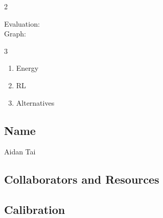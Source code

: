 \documentclass[submit]{harvardml}
\begin{document}
\newpage
\begin{sol}{}{2}
  \begin{center}
    Evaluation:\\
    Graph:
  \end{center}
\end{sol}


\newpage
\begin{sol}{}{3}
  \begin{center}
    \begin{enumerate}
        \item Energy
        \item RL
        \item Alternatives
    \end{enumerate}
  \end{center}
\end{sol}

\newpage
\subsection*{Name}
Aidan Tai
\subsection*{Collaborators and Resources}

\subsection*{Calibration}
\end{document}

